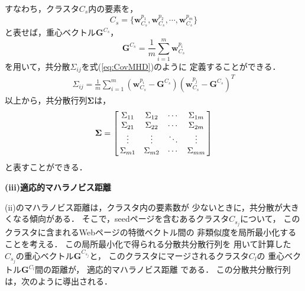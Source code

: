 \documentclass[japanese]{jnlp_1.4}
\begin{document}
すなわち，クラスタ$C_{s}$内の要素を，
\[
 C_{s}=\{\boldsymbol{w}^{p_{1}}_{C_{s}},\boldsymbol{w}^{p_{2}}_{C_{s}},\cdots ,\boldsymbol{w}^{p_{m}}_{C_{s}}\}
\]
と表せば，重心ベクトル$\boldsymbol{G}^{C_{s}}$，
\[
 \boldsymbol{G}^{C_{s}}=\frac{1}{m}\sum_{i=1}^{m}\boldsymbol{w}^{p_{i}}_{C_{s}}
\]
を用いて，共分散$\Sigma_{ij}$を式(\ref{eq:CovMHD})のように
定義することができる．
\begin{eqnarray}
 \Sigma_{ij}=\frac{1}{m}\sum_{i=1}^{m}(\boldsymbol{w}^{p_{i}}_{C_{s}}-\boldsymbol{G}^{C_{s}})
(\boldsymbol{w}^{p_{j}}_{C_{s}}-\boldsymbol{G}^{C_{s}})^{T} \label{eq:CovMHD}
\end{eqnarray}
以上から，共分散行列$\boldsymbol{\Sigma}$は，
\[
 \boldsymbol{\Sigma}=\left[
 \begin{array}{@{\,}cccc@{\,}}
  \Sigma_{11} & \Sigma_{12} & \cdots & \Sigma_{1m} \\
  \Sigma_{21} & \Sigma_{22} & \cdots & \Sigma_{2m} \\
  \vdots      & \vdots      & \ddots & \vdots \\
  \Sigma_{m1} & \Sigma_{m2} & \cdots & \Sigma_{mm}
 \end{array}
\right]
\]
と表すことができる．

\noindent
\textbf{(iii)適応的マハラノビス距離}

(ii)のマハラノビス距離は，クラスタ内の要素数が
少ないときに，共分散が大きくなる傾向がある．
そこで，seedページを含むあるクラスタ$C_{s_{j}}$について，
このクラスタに含まれるWebページの特徴ベクトル間の
非類似度を局所最小化することを考える．
この局所最小化で得られる分散共分散行列を
用いて計算した
$C_{s_{j}}$の重心ベクトル$\boldsymbol{G}^{C_{s_{j}}}$と，
このクラスタにマージされるクラスタ$C_{l}$の
重心ベクトル$\boldsymbol{G}^{C_{l}}$間の距離が，
適応的マハラノビス距離 \cite{Diday77} である．
この分散共分散行列は，次のように導出される．
\end{document}
